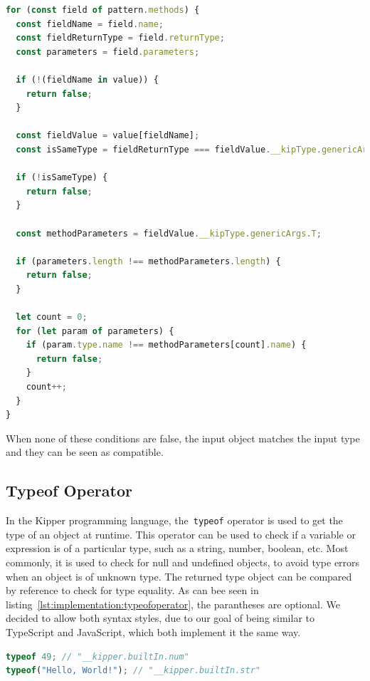 \begin{lstlisting}[language=Typescript,caption=Matches operator method comparison,label=lst:implementation:matchesmethod]
for (const field of pattern.methods) {
  const fieldName = field.name;
  const fieldReturnType = field.returnType;
  const parameters = field.parameters;

  if (!(fieldName in value)) {
    return false;
  }

  const fieldValue = value[fieldName];
  const isSameType = fieldReturnType === fieldValue.__kipType.genericArgs.R;

  if (!isSameType) {
    return false;
  }

  const methodParameters = fieldValue.__kipType.genericArgs.T;

  if (parameters.length !== methodParameters.length) {
    return false;
  }

  let count = 0;
  for (let param of parameters) {
    if (param.type.name !== methodParameters[count].name) {
      return false;
    }
    count++;
  }
}
\end{lstlisting}

When none of these conditions are false, the input object matches the input type and they can be seen as compatible.

\subsection{Typeof Operator}
\label{subsec:typeof}

In the Kipper programming language, the~\lstinline|typeof| operator is used to get the type of an object at runtime. This operator can be used to check if a variable or expression is of a particular type, such as a string, number, boolean, etc. Most commonly, it is used to check for null and undefined objects, to avoid type errors when an object is of unknown type. The returned type object can be compared by reference to check for type equality. As can bee seen in listing~\ref{lst:implementation:typeofoperator}, the parantheses are optional. We decided to allow both syntax styles, due to our goal of being similar to TypeScript and JavaScript, which both implement it the same way.

\begin{lstlisting}[language=Typescript,caption=Typeof operator used to determine the type of an input expression,label=lst:implementation:typeofoperator]
typeof 49; // "__kipper.builtIn.num"
typeof("Hello, World!"); // "__kipper.builtIn.str"
\end{lstlisting}

